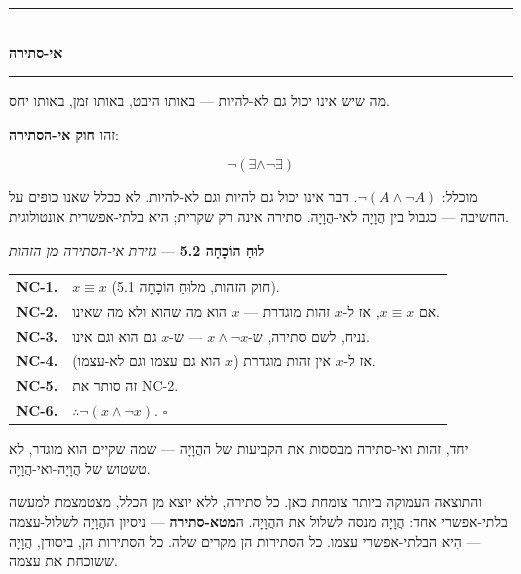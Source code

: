\documentclass[10pt, openany, oneside]{book}
\renewcommand{\normalsize}{\fontsize{10}{13}\selectfont}
\renewcommand{\footnotesize}{\fontsize{8.5}{11}\selectfont}
\begin{document}
\begin{center}
    \rule{0.3\textwidth}{0.4pt}\\[0.5em]
    {\normalsize\bfseries\textsc{אי-סתירה}}\\[0.3em]
    \rule{0.3\textwidth}{0.4pt}
\end{center}

\vspace{1em}

\noindent מה שיש אינו יכול גם לא-להיות — באותו היבט, באותו זמן, באותו יחס.

זהו \textbf{חוק אי-הסתירה}:

$$\neg(\exists \wedge \neg\exists)$$

מוכלל: $\neg(A \wedge \neg A)$. דבר אינו יכול גם להיות וגם לא-להיות. לא ככלל שאנו כופים על החשיבה — כגבול בין הֲוָיָה לאי-הֲוָיָה. סתירה אינה רק שקרית; היא בלתי-אפשרית אונטולוגית.

\vspace{0.5em}

\textbf{לוּחַ הוֹכָחָה 5.2} --- \textit{גזירת אי-הסתירה מן הזהות}

\vspace{0.5em}

{\footnotesize
\noindent\begin{tabular}{r p{}}
\textbf{NC-1.} & $x \equiv x$ (חוק הזהות, מלוּחַ הוֹכָחָה 5.1). \\[0.3em]
\textbf{NC-2.} & אם $x \equiv x$, אז ל-$x$ זהות מוגדרת — $x$ הוא מה שהוא ולא מה שאינו. \\[0.3em]
\textbf{NC-3.} & נניח, לשם סתירה, ש-$x \wedge \neg x$ — ש-$x$ גם הוא וגם אינו. \\[0.3em]
\textbf{NC-4.} & אז ל-$x$ אין זהות מוגדרת ($x$ הוא גם עצמו וגם לא-עצמו). \\[0.3em]
\textbf{NC-5.} & זה סותר את NC-2. \\[0.3em]
\textbf{NC-6.} & $\therefore \neg(x \wedge \neg x)$. $\square$ \\[0.3em]
\end{tabular}
}

\vspace{0.8em}

\noindent יחד, זהות ואי-סתירה מבססות את הקביעות של ההֲוָיָה — שמה שקיים הוא מוגדר, לא טשטוש של הֲוָיָה-ואי-הֲוָיָה.

והתוצאה העמוקה ביותר צומחת כאן. כל סתירה, ללא יוצא מן הכלל, מצטמצמת למעשה בלתי-אפשרי אחד: הֲוָיָה מנסה לשלול את ההֲוָיָה. ה\textbf{מטא-סתירה} — ניסיון ההֲוָיָה לשלול-עצמה — הִיא הבלתי-אפשרי עצמו. כל הסתירות הן מקרים שלה. כל הסתירות הן, ביסודן, הֲוָיָה ששוכחת את עצמה.
\end{document}
